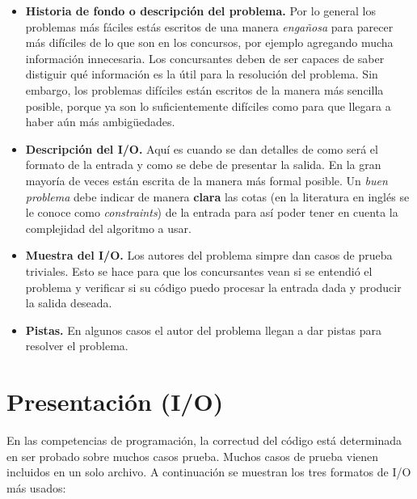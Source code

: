 \begin{itemize}
\item \textbf{Historia de fondo o descripción del problema.} Por lo general los problemas más
fáciles estás escritos de una manera \emph{engañosa} para parecer más difíciles de lo que son en
los concursos, por ejemplo agregando mucha información innecesaria. Los concursantes deben de
ser capaces de saber distiguir qué información es la útil para la resolución del problema. Sin
embargo, los problemas difíciles están escritos de la manera más sencilla posible, porque ya
son lo suficientemente difíciles como para que llegara a haber aún más ambigüedades.

\item \textbf{Descripción del I/O.} Aquí es cuando se dan detalles de como será el formato de la
entrada y como se debe de presentar la salida. En la gran mayoría de veces están escrita de la
manera más formal posible. Un \emph{buen problema} debe indicar de manera \textbf{clara} las cotas 
(en la literatura en inglés se le conoce como \emph{constraints}) de la entrada para así poder
tener en cuenta la complejidad del algoritmo a usar.

\item \textbf{Muestra del I/O.} Los autores del problema simpre dan casos de prueba triviales. Esto
se hace para que los concursantes vean si se entendió el problema y verificar si su código puedo
procesar la entrada dada y producir la salida deseada.

\item \textbf{Pistas.} En algunos casos el autor del problema llegan a dar pistas para resolver
el problema.

\end{itemize}

\section{Presentación (I/O)}

En las competencias de programación, la correctud del código está determinada en ser probado
sobre muchos casos prueba. Muchos casos de prueba vienen incluidos en un solo archivo. A
continuación se muestran los tres formatos de I/O más usados:


